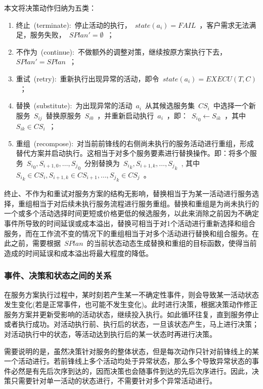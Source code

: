 本文将决策动作归纳为五类：
\begin{enumerate}
\item 终止~(terminate):~停止活动的执行，~$state(a_i)=FAIL$~，客户需求无法满足，服务失败，~$SPlan'=\emptyset $~；
\item 不作为~(continue):~不做额外的调整对策，继续按原方案执行下去，~$SPlan'=SPlan$~；
\item 重试~(retry):~重新执行出现异常的活动，即令~$state(a_i)=EXECU(T, C)$~；
\item 替换~(substitute):~为出现异常的活动~$a_i$~从其候选服务集~$CS_i$~中选择一个新服务~$S_{ij}$~替换原服务~$S_{i0}$~，并重新启动执行~$a_i$~，即：~${S_i}_0 \leftarrow {S_{ik}}$~，其中~${S_{ik}} \in C{S_i}$~；
\item 重组~(recompose):~对当前前锋线的右侧尚未执行的服务活动进行重组，形成替代方案并启动执行。这相当于对多个服务要素进行替换操作。即：将多个服务~${S_i}_0,{S_{i + 1,0}}, \ldots ,{S_j}_0$~分别替换为~${S_i}_k,{S_{i + 1,k}}, \ldots ,{S_j}_k$~, 其中~${S_i}_k \in C{S_i},{S_{i + 1,k}} \in C{S_{i + 1}}, \ldots ,{S_j}_k \in C{S_j}$~。
\end{enumerate}

终止、不作为和重试对服务方案的结构无影响，替换相当于为某一活动进行服务选择，重组相当于对后续未执行服务流程进行服务重组。替换和重组是为尚未执行的一个或多个活动选择时间更短或价格更低的候选服务，以此来消除之前因为不确定事件所导致的时间延误或成本溢出，替换可相当于对1个活动进行重新选择和组合服务，而在工作流不变的情况下的重组相当于对多个活动进行替换和组合服务。在此之前，需要根据~$SPlan$~的当前状态动态生成替换和重组的目标函数，使得当前造成的时间延误和成本溢出将最大程度的降低。

\subsubsection{事件、决策和状态之间的关系}

在服务方案执行过程中，某时刻若产生某一不确定性事件，则会导致某一活动状态发生变化(若是正常事件，也可能不发生变化)。此时进行决策，根据决策动作修正服务方案并更新受影响的活动状态，继续投入执行。如此循环往复，直到服务停止或者执行成功。对活动执行前、执行后的状态，一旦该状态产生，马上进行决策；对活动执行中的状态，等活动达到执行后的某一状态时再进行决策。

需要说明的是，虽然决策针对服务的整体状态，但是每次动作只针对前锋线上的某一个活动进行。若前锋线上多个活动均处于异常状态，那么多个导致异常状态的事件必然是有先后次序到达的，因而决策也会随事件到达的先后次序进行。因此，决策只需要针对单一活动的状态进行，不需要针对多个异常活动进行。

